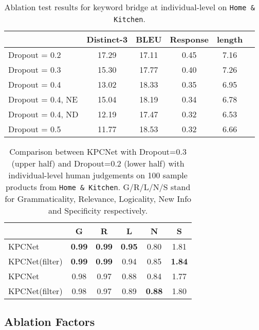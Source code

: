 \begin{table}[htbp]
  \centering
  \begin{tabular}{l|ccccc}
  \hline
  {} & Distinct-3 & BLEU & Response & length \\
  \hline
  Dropout = 0.2 & 17.29 & 17.11 & 0.45 & 7.16 \\ 
  Dropout = 0.3 & 15.30 & 17.77 & 0.40 & 7.26 \\
  Dropout = 0.4 & 13.02 & 18.33 & 0.35 & 6.95 \\
  Dropout = 0.4, NE & 15.04 & 18.19 & 0.34 & 6.78 \\
  Dropout = 0.4, ND & 12.19 & 17.47 & 0.32 & 6.53 \\
  Dropout = 0.5 & 11.77 & 18.53 & 0.32 & 6.66 \\
  \hline
  \end{tabular}
  \caption{\label{table:ablation2} Ablation test results for keyword bridge at individual-level on \texttt{Home \& Kitchen}.}
  \end{table}

  

  \begin{table}[htbp]
    \centering
    \begin{tabular}{l|ccccc}
    \hline
    {} & G & R & L & N & S \\
    \hline
    KPCNet &        \textbf{0.99} &     \textbf{0.99} &    \textbf{0.95} &     0.80 &     1.81 \\
    KPCNet(filter) &        \textbf{0.99} &     \textbf{0.99} &    0.94 &     0.85 &     \textbf{1.84} \\
    \hline
    KPCNet &        0.98 &     0.97 &    0.88 &     0.84 &     1.77 \\
    KPCNet(filter) &        0.98 &     0.97 &    0.89 &     \textbf{0.88} &     1.80 \\
    \hline
    \end{tabular}
    \caption{\label{tab:ind-human-eval-2} Comparison between KPCNet with Dropout=0.3 (upper half) and Dropout=0.2 (lower half) with individual-level human judgements on 100 sample products from \texttt{Home \& Kitchen}. G/R/L/N/S stand for Grammaticality, Relevance, Logicality, New Info and Specificity respectively.}
    \end{table} 

\subsection{Ablation Factors}

